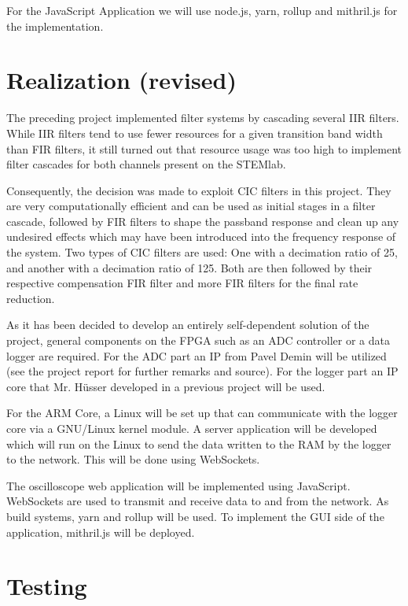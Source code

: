 \documentclass[a4paper,oneside]{alpenspecs/alpenspecs}
\begin{document}
For  the  JavaScript  Application  we  will  use  node.js,  yarn,  rollup  and
mithril.js for the implementation.

\section{Realization (revised)}

The  preceding project  implemented filter  systems by  cascading several  IIR
filters.  While IIR filters tend to use fewer resources for a given transition
band width than FIR  filters, it still turned out that  resource usage was too
high to implement filter cascades for both channels present on the STEMlab.

Consequently, the  decision was made to  exploit CIC filters in  this project.
They are very computationally efficient and can be used as initial stages in a
filter cascade,  followed by FIR  filters to  shape the passband  response and
clean  up any  undesired  effects  which may  have  been  introduced into  the
frequency response of the system. Two types  of CIC filters are used: One with
a  decimation ratio  of  \num{25},  and another  with  a  decimation ratio  of
\num{125}.  Both are then followed by their respective compensation FIR filter
and more FIR filters for the final rate reduction.

As it has  been decided to develop an entirely  self-dependent solution of the
project, general components  on the FPGA such  as an ADC controller  or a data
logger are required. For the ADC part an  IP from Pavel Demin will be utilized
(see the project  report for further remarks and source). For  the logger part
an IP core that Mr. Hüsser developed in a previous project will be used.

For the ARM Core, a Linux will be  set up that can communicate with the logger
core via  a GNU/Linux kernel  module. A server application will  be developed
which will run on the Linux to send  the data written to the RAM by the logger
to the network. This will be done using WebSockets.

The    oscilloscope    web    application   will    be    implemented    using
JavaScript. WebSockets are used  to transmit and receive data to  and from the
network.  As build systems, yarn and rollup will be used. To implement the GUI
side of the application, mithril.js will be deployed.

\section{Testing}
\end{document}

